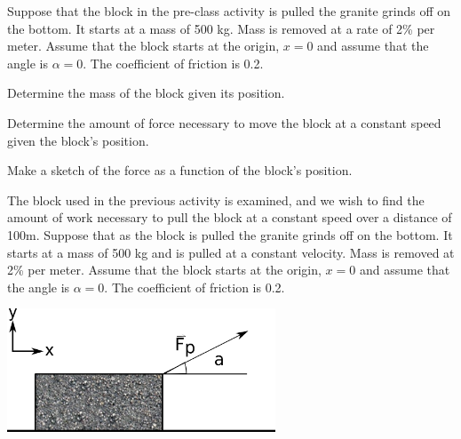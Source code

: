 \begin{problem}
\begin{subproblem}
      \vfill

%
      \vfill

%

  \end{subproblem}


\end{problem}


\begin{problem}
\item Suppose that the block in the pre-class activity is pulled the
  granite grinds off on the bottom. It starts at a mass of 500
  kg. Mass is removed at a rate of 2\% per meter. Assume that the
  block starts at the origin, $x=0$ and assume that the angle is
  $\alpha=0$. The coefficient of friction is 0.2.

  \begin{subproblem}
  \item Determine the mass of the block given its position.
    \vfill
  \item Determine the amount of force necessary to move the block at a
    constant speed given the block's position.
    \vfill
  \item Make a sketch of the force as a function of the block's
    position.

    \vfill
  \end{subproblem}

\clearpage

\item The block used in the previous activity is examined, and we wish
  to find the amount of work necessary to pull the block at a constant
  speed over a distance of 100m.  Suppose that as the block is pulled
  the granite grinds off on the bottom. It starts at a mass of 500 kg
  and is pulled at a constant velocity. Mass is removed at 2\% per
  meter. Assume that the block starts at the origin, $x=0$ and assume
  that the angle is $\alpha=0$. The coefficient of friction is 0.2.

  \includegraphics[width=8cm]{ink/week7/dragBlock}


\end{problem}
